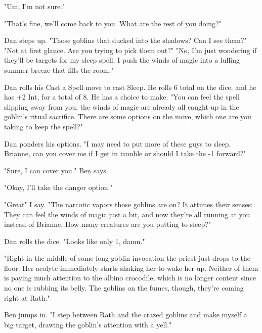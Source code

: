  

"Um, I'm not sure."

 

"That's fine, we'll come back to you. What are the rest of you doing?"

 

Dan steps up. "Those goblins that ducked into the shadows? Can I see them?" "Not at first glance. Are you trying to pick them out?" "No, I'm just wondering if they'll be targets for my sleep spell. I push the winds of magic into a lulling summer breeze that fills the room."

 

Dan rolls his Cast a Spell move to cast Sleep. He rolls 6 total on the dice, and he has +2 Int, for a total of 8. He has a choice to make. "You can feel the spell slipping away from you, the winds of magic are already all caught up in the goblin's ritual sacrifice. There are some options on the move, which one are you taking to keep the spell?"

 

Dan ponders his options. "I may need to put more of these guys to sleep. Brianne, can you cover me if I get in trouble or should I take the -1 forward?"

 

"Sure, I can cover you." Ben says.

 

"Okay, I'll take the danger option."

 

"Great" I say. "The narcotic vapors those goblins are on? It attunes their senses: They can feel the winds of magic just a bit, and now they're all running at you instead of Brianne. How many creatures are you putting to sleep?"

 

Dan rolls the dice. "Looks like only 1, damn."

 

"Right in the middle of some long goblin invocation the priest just drops to the floor. Her acolyte immediately starts shaking her to wake her up. Neither of them is paying much attention to the albino crocodile, which is no longer content since no one is rubbing its belly. The goblins on the fumes, though, they're coming right at Rath."

 

Ben jumps in. "I step between Rath and the crazed goblins and make myself a big target, drawing the goblin's attention with a yell."

